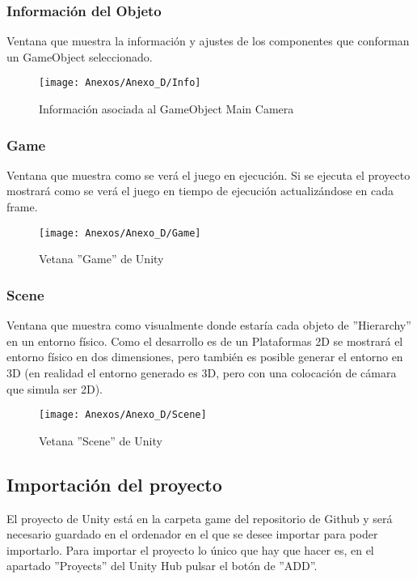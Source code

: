 \subsubsection{Información del Objeto}
Ventana que muestra la información y ajustes de los componentes que conforman un GameObject seleccionado.

\begin{figure}[h]
\centering
\texttt{[image: Anexos/Anexo\_D/Info]}
\caption{Información asociada al GameObject Main Camera}
\end{figure}

\subsubsection{Game}
Ventana que muestra como se verá el juego en ejecución. Si se ejecuta el proyecto mostrará como se verá el juego en tiempo de ejecución actualizándose en cada frame.

\begin{figure}[h]
\centering
\texttt{[image: Anexos/Anexo\_D/Game]}
\caption{Vetana ''Game'' de Unity}
\end{figure}

\subsubsection{Scene}
Ventana que muestra como visualmente donde estaría cada objeto de ''Hierarchy'' en un entorno físico. Como el desarrollo es de un Plataformas 2D se mostrará el entorno físico en dos dimensiones, pero también es posible generar el entorno en 3D (en realidad el entorno generado es 3D, pero con una colocación de cámara que simula ser 2D).

\clearpage
\begin{figure}[h]
\centering
\texttt{[image: Anexos/Anexo\_D/Scene]}
\caption{Vetana ''Scene'' de Unity}
\end{figure}

\subsection{Importación del proyecto}
El proyecto de Unity está en la carpeta game del repositorio de Github y será necesario guardado en el ordenador en el que se desee importar para poder importarlo.
Para importar el proyecto lo único que hay que hacer es, en el apartado ''Proyects'' del Unity Hub pulsar el botón de ''ADD''.

